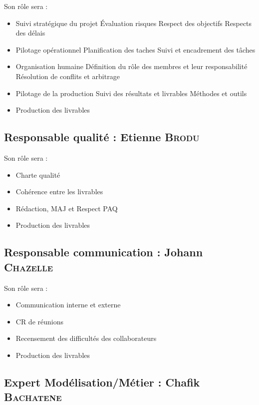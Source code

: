 Son rôle sera :
\begin{itemize}
    \item Suivi stratégique du projet
        \subitem Évaluation risques
        \subitem Respect des objectifs
        \subitem Respects des délais
    \item Pilotage opérationnel
        \subitem Planification des taches
        \subitem Suivi et encadrement des tâches
    \item Organisation humaine
        \subitem Définition du rôle des membres et leur responsabilité
        \subitem Résolution de conflits et arbitrage
    \item Pilotage de la production
        \subitem Suivi des résultats et livrables
        \subitem Méthodes et outils
    \item Production des livrables
\end{itemize}

\subsection{Responsable qualité : Etienne \textsc{Brodu}}

Son rôle sera :
\begin{itemize}
    \item Charte qualité
    \item Cohérence entre les livrables
    \item Rédaction, MAJ  et Respect PAQ
    \item Production des livrables
\end{itemize}

\subsection{Responsable communication : Johann \textsc{Chazelle}}

Son rôle sera :
\begin{itemize}
    \item Communication interne et externe
    \item CR de réunions
    \item Recensement des difficultés des collaborateurs
    \item Production des livrables
\end{itemize}

\subsection{Expert Modélisation/Métier : Chafik \textsc{Bachatene}}

